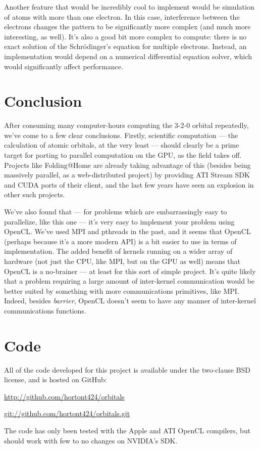 \documentclass{acmsiggraph}
\begin{document}
Another feature that would be incredibly cool to implement would be simulation of atoms with more than one electron. In this case, interference between the electrons changes the pattern to be significantly more complex (and much more interesting, as well). It's also a good bit more complex to compute: there is no exact solution of the Schr\"{o}dinger's equation for multiple electrons. Instead, an implementation would depend on a numerical differential equation solver, which would significantly affect performance.

\section{Conclusion}

After consuming many computer-hours computing the 3-2-0 orbital repeatedly, we've come to a few clear conclusions. Firstly, scientific computation --- the calculation of atomic orbitals, at the very least --- should clearly be a prime target for porting to parallel computation on the GPU, as the field takes off. Projects like Folding@Home are already taking advantage of this (besides being massively parallel, as a web-distributed project) by providing ATI Stream SDK and CUDA ports of their client, and the last few years have seen an explosion in other such projects.

We've also found that --- for problems which are embarrassingly easy to parallelize, like this one --- it's very easy to implement your problem using OpenCL. We've used MPI and pthreads in the past, and it seems that OpenCL (perhaps because it's a more modern API) is a bit easier to use in terms of implementation. The added benefit of kernels running on a wider array of hardware (not just the CPU, like MPI, but on the GPU as well) means that OpenCL is a no-brainer --- at least for this sort of simple project. It's quite likely that a problem requiring a large amount of inter-kernel communication would be better suited by something with more communications primitives, like MPI. Indeed, besides {\it barrier}, OpenCL doesn't seem to have any manner of inter-kernel communications functions.




\section{Code}

All of the code developed for this project is available under the two-clause BSD license, and is hosted on GitHub:

\url{http://github.com/hortont424/orbitals}

\url{git://github.com/hortont424/orbitals.git}

The code has only been tested with the Apple and ATI OpenCL compilers, but should work with few to no changes on NVIDIA's SDK.


\nocite{*}

\end{document}
